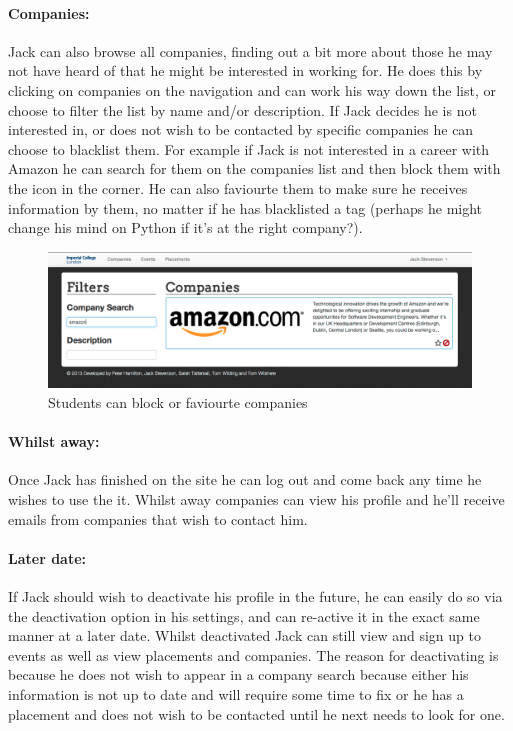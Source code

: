 
  \paragraph{Companies:}
    Jack can also browse all companies, finding out a bit more about those he may not have heard of that he might be interested in working for. He does this by clicking on companies on the navigation and can work his way down the list, or choose to filter the list by name and/or description.
    If Jack decides he is not interested in, or does not wish to be contacted by specific companies he can choose to blacklist them. For example if Jack is not interested in a career with Amazon he can search for them on the companies list and then block them with the icon in the corner. He can also faviourte them to make sure he receives information by them, no matter if he has blacklisted a tag (perhaps he might change his mind on Python if it's at the right company?).

    \begin{figure}[H]\centering
    \includegraphics[scale=0.3]{images/user_experiences/student/block_amazon}
    \caption{Students can block or faviourte companies}
    \end{figure}

  \paragraph{Whilst away:}
    Once Jack has finished on the site he can log out and come back any time he wishes to use the it. Whilst away companies can view his profile and he'll receive emails from companies that wish to contact him.

  \paragraph{Later date:}
    If Jack should wish to deactivate his profile in the future, he can easily do so via the deactivation option in his settings, and can re-active it in the exact same manner at a later date. Whilst deactivated Jack can still view and sign up to events as well as view placements and companies. The reason for deactivating is because he does not wish to appear in a company search because either his information is not up to date and will require some time to fix or he has a placement and does not wish to be contacted until he next needs to look for one.


